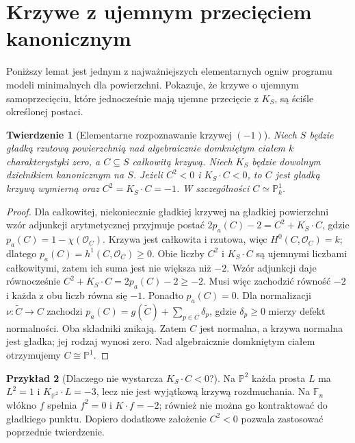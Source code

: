\documentclass[11pt,a4paper,openany]{report}
\numberwithin{equation}{section}
\theoremstyle{plain}
\newtheorem{twierdzenie}{Twierdzenie}[section]
\theoremstyle{definition}
\newtheorem{przyklad}[twierdzenie]{Przykład}
\theoremstyle{remark}
\newcommand{\PP}{\mathbb P}
\begin{document}
\section{Krzywe z ujemnym przecięciem kanonicznym}
\label{sec:ga8-negative-curves}

Poniższy lemat jest jednym z najważniejszych elementarnych
ogniw programu modeli minimalnych dla powierzchni.
Pokazuje, że krzywe o ujemnym samoprzecięciu, które
jednocześnie mają ujemne przecięcie z $K_S$, są
ściśle określonej postaci.

\begin{twierdzenie}[Elementarne rozpoznawanie krzywej $(-1)$]
\label{tw:ga8-negative-implies-minusone}
Niech $S$ będzie gładką rzutową powierzchnią nad
algebraicznie domkniętym ciałem $k$ charakterystyki zero,
a $C\subseteq S$ całkowitą krzywą. Niech $K_S$
będzie dowolnym dzielnikiem kanonicznym na $S$.
Jeżeli $C^2<0$ i $K_S\cdot C<0$,
to $C$ jest gładką krzywą wymierną oraz
$C^2=K_S\cdot C=-1$. W szczególności
$C\simeq\PP^1_k$.
\end{twierdzenie}
\begin{proof}
Dla całkowitej, niekoniecznie gładkiej krzywej
na gładkiej powierzchni wzór adjunkcji arytmetycznej
przyjmuje postać
$2p_a(C)-2=C^2+K_S\cdot C$, gdzie
$p_a(C)=1-\chi(\mathcal O_C)$.
Krzywa jest całkowita i rzutowa, więc
$H^0(C,\mathcal O_C)=k$; dlatego
$p_a(C)=h^1(C,\mathcal O_C)\ge0$.
Obie liczby $C^2$ i $K_S\cdot C$ są ujemnymi
liczbami całkowitymi, zatem ich suma jest nie
większa niż $-2$. Wzór adjunkcji daje równocześnie
$C^2+K_S\cdot C=2p_a(C)-2\ge-2$.
Musi więc zachodzić równość $-2$ i każda z obu
liczb równa się $-1$. Ponadto $p_a(C)=0$.
Dla normalizacji $\nu:\widetilde C\to C$ zachodzi
$p_a(C)=g(\widetilde C)+\sum_{p\in C}\delta_p$,
gdzie $\delta_p\ge0$ mierzy defekt normalności.
Oba składniki znikają. Zatem $C$ jest normalna,
a krzywa normalna jest gładka; jej rodzaj wynosi zero.
Nad algebraicznie domkniętym ciałem otrzymujemy
$C\cong\PP^1$.
\end{proof}

\begin{przyklad}[Dlaczego nie wystarcza $K_S\cdot C<0$?]
Na $\PP^2$ każda prosta $L$ ma $L^2=1$ i
$K_{\PP^2}\cdot L=-3$, lecz nie jest wyjątkową
krzywą rozdmuchania. Na $\mathbb F_n$ włókno $f$
spełnia $f^2=0$ i $K\cdot f=-2$; również nie
można go kontraktować do gładkiego punktu.
Dopiero dodatkowe założenie $C^2<0$ pozwala
zastosować poprzednie twierdzenie.
\end{przyklad}
\end{document}
